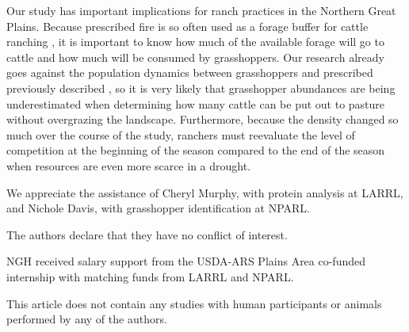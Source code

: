 \documentclass[referee, 
	            sn-basic]
           {sn-jnl}
\begin{document}
\begin{linenumbers}
Our study has important implications for ranch practices in the Northern
Great Plains. Because prescribed fire is so often used as a forage
buffer for cattle ranching \citep{spiess2020}, it is important to know
how much of the available forage will go to cattle and how much will be
consumed by grasshoppers. Our research already goes against the
population dynamics between grasshoppers and prescribed previously
described \citep{joern2004, vermeire2004}, so it is very likely that
grasshopper abundances are being underestimated when determining how
many cattle can be put out to pasture without overgrazing the landscape.
Furthermore, because the density changed so much over the course of the
study, ranchers must reevaluate the level of competition at the
beginning of the season compared to the end of the season when resources
are even more scarce in a drought.

\backmatter



We appreciate the assistance of Cheryl Murphy, with protein analysis at LARRL, and Nichole Davis, with grasshopper identification at NPARL. 



The authors declare that they have no conflict of interest.


NGH received salary support from the USDA-ARS Plains Area co-funded internship with matching funds from LARRL and NPARL. 


This article does not contain any studies with human participants or animals performed by any of the authors.  



\end{linenumbers}
\end{document}
